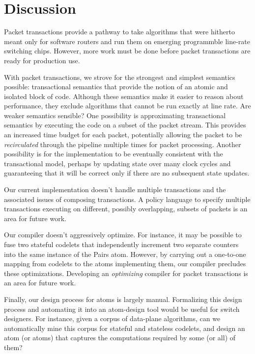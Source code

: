 \section{Discussion}
Packet transactions provide a pathway to take algorithms that were hitherto
meant only for software routers and run them on emerging programmble line-rate
switching chips. However, more work must be done before packet transactions
are ready for production use.

\begin{CompactEnumerate}
\item With packet transactions, we strove for the strongest and simplest
semantics possible: transactional semantics that provide the notion of an
atomic and isolated block of code. Although these semantics make it easier to
reason about performance, they exclude algorithms that cannot be run exactly at
line rate. Are weaker semantics sensible? One possibility is approximating
transactional semantics by executing the code on a subset of the packet stream.
This provides an increased time budget for each packet, potentially allowing
the packet to be {\em recirculated} through the pipeline multiple times
for packet processing. Another possibility is for the implementation to
be eventually consistent with the transactional model, perhaps by updating
state over many clock cycles and guaranteeing that it will be correct only if
there are no subsequent state updates.
\item Our current implementation doesn't handle multiple transactions and the
associated issues of composing transactions. A policy language to
specify multiple transactions executing on different, possibly overlapping,
subsets of packets is an area for future work.
\item Our compiler doesn't aggressively optimize. For instance, it may be
possible to fuse two stateful codelets that independently increment two
separate counters into the same instance of the Pairs atom. However, by
carrying out a one-to-one mapping from codelets to the atoms implementing them,
our compiler precludes these optimizations.  Developing an {\em optimizing}
compiler for packet transactions is an area for future work.
\item Finally, our design process for atoms is largely manual.  Formalizing
this design process and automating it into an atom-design tool would be useful
for switch designers. For instance, given a corpus of data-plane algorithms,
can we automatically mine this corpus for stateful and stateless codelets, and
design an atom (or atoms) that captures the computations required by some (or
all) of them?
\end{CompactEnumerate}
